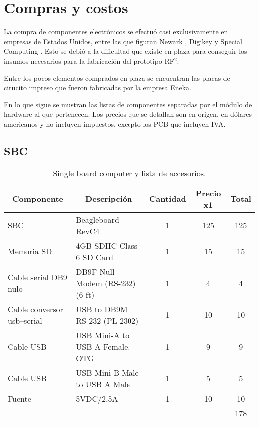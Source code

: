 \chapter{Compras y costos}

La compra de componentes electrónicos se efectuó casi exclusivamente en empresas 
de Estados Unidos, entre las que figuran Newark \cite{Nw}, Digikey \cite{Dk} y Special Computing \cite{SpeCom}. Esto se debió a la dificultad que existe en plaza para conseguir los insumos
necesarios para la fabricación del prototipo RF$^{2}$. 

Entre los pocos elementos comprados en plaza se encuentran las placas de cirucito
impreso que fueron fabricadas por la empresa Eneka. 

En lo que sigue se mustran las listas de componentes separadas por el módulo de 
hardware al que pertenecen. Los precios que se detallan son en origen,
en dólares americanos y no incluyen impuestos, excepto los PCB que incluyen IVA.

\newpage
\section{SBC}
\begin{longtable}{|p{3cm}|l|c|c|c|}
\hline
\multicolumn{1}{|c|}{\textbf{Componente}} & \multicolumn{1}{c|}{\textbf{Descripción}} & \textbf{Cantidad} & \textbf{Precio x1} & \textbf{Total} \\ \hline
SBC & Beagleboard  RevC4 & 1 & 125 & 125 \\ \hline
Memoria SD & 4GB SDHC Class 6 SD Card & 1 & 15 & 15 \\ \hline
Cable serial DB9 nulo & DB9F Null Modem (RS-232) (6-ft) & 1 & 4 & 4 \\ \hline
Cable conversor usb–serial & USB to DB9M RS-232 (PL-2302) & 1 & 10 & 10 \\ \hline
Cable USB & USB Mini-A to USB A Female, OTG & 1 & 9 & 9 \\ \hline
Cable USB & USB Mini-B Male to USB A Male & 1 & 5 & 5 \\ \hline
Fuente  & 5VDC/2,5A & 1 & 10 & 10 \\ \hline
 &  & \multicolumn{1}{l|}{} & \multicolumn{1}{l|}{} & 178 \\ \hline
\caption{Single board computer y lista de accesorios.}
\label{}
\end{longtable}


